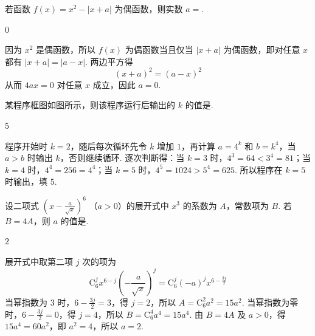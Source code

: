 \begin{problem}
若函数 \( f(x) = x^2 - |x + a| \) 为偶函数，则实数 \( a = \)\fillinblank{}.
\end{problem}

\begin{answer}
\(0\)
\end{answer}

\begin{solution}
因为 \(x^2\) 是偶函数，所以 \(f(x)\) 为偶函数当且仅当 \(\lvert x+a\rvert\) 为偶函数，即对任意 \(x\) 都有 \(\lvert x+a\rvert=\lvert a-x\rvert\). 两边平方得
\[
(x+a)^2=(a-x)^2
\]
从而 \(4ax=0\) 对任意 \(x\) 成立，因此 \(a=0\).
\end{solution}

\begin{problem}
某程序框图如图所示，则该程序运行后输出的 \(k\) 的值是\fillinblank{}.

\begin{center}
\end{center}
\end{problem}

\begin{answer}
\(5\)
\end{answer}

\begin{solution}
程序开始时 \(k=2\)，随后每次循环先令 \(k\) 增加 \(1\)，再计算 \(a=4^k\) 和 \(b=k^4\)，当 \(a>b\) 时输出 \(k\)，否则继续循环. 逐次判断得：当 \(k=3\) 时，\(4^3=64<3^4=81\)；当 \(k=4\) 时，\(4^4=256=4^4\)；当 \(k=5\) 时，\(4^5=1024>5^4=625\). 所以程序在 \(k=5\) 时输出，填 \(5\).
\end{solution}

\begin{problem}
设二项式 \(\left(x - \frac{a}{\sqrt{x}}\right)^6\) （\(a > 0\)）的展开式中 \(x^3\) 的系数为 \(A\)，常数项为 \(B\). 若 \(B = 4A\)，则 \(a\) 的值是\fillinblank{}.
\end{problem}

\begin{answer}
\(2\)
\end{answer}

\begin{solution}
展开式中取第二项 \(j\) 次的项为
\[
\mathrm C_6^j x^{6-j}\left(-\frac{a}{\sqrt{x}}\right)^j=\mathrm C_6^j(-a)^j x^{6-\frac{3j}{2}}
\]
当幂指数为 \(3\) 时，\(6-\frac{3j}{2}=3\)，得 \(j=2\)，所以 \(A=\mathrm C_6^2a^2=15a^2\). 当幂指数为零时，\(6-\frac{3j}{2}=0\)，得 \(j=4\)，所以 \(B=\mathrm C_6^4a^4=15a^4\). 由 \(B=4A\) 及 \(a>0\)，得 \(15a^4=60a^2\)，即 \(a^2=4\)，所以 \(a=2\).
\end{solution}

